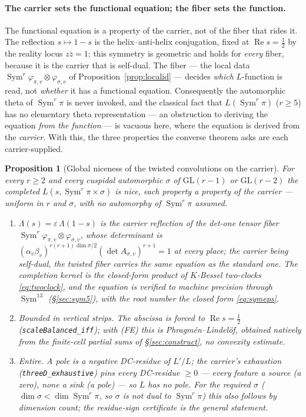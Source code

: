 \documentclass[11pt]{article}
\newtheorem{proposition}[theorem]{Proposition}
\theoremstyle{definition}
\renewcommand{\Re}{\operatorname{Re}}
\newcommand{\Sym}{\operatorname{Sym}}
\begin{document}
\paragraph{The carrier sets the functional equation; the fiber sets the function.} The functional
equation is a property of the carrier, not of the fiber that rides it. The reflection $s\mapsto1-s$ is
the helix--anti-helix conjugation, fixed at $\Re s=\tfrac12$ by the reality locus $z\bar z=1$; this
symmetry is geometric and holds for \emph{every} fiber, because it is the carrier that is self-dual. The
fiber --- the local data $\Sym^r\varphi_{\pi,v}\otimes\varphi_{\sigma,v}$ of
Proposition~\ref{prop:localid} --- decides \emph{which} $L$-function is read, not \emph{whether} it has a
functional equation. Consequently the automorphic theta of $\Sym^r\pi$ is never invoked, and the
classical fact that $L(\Sym^r\pi)$ ($r\ge5$) has no elementary theta representation --- an obstruction to
deriving the equation \emph{from the function} --- is vacuous here, where the equation is derived from
the \emph{carrier}. With this, the three properties the converse theorem asks are each carrier-supplied.

\begin{proposition}[Global niceness of the twisted convolutions on the carrier]\label{prop:niceness}
For every $r\ge2$ and every cuspidal automorphic $\sigma$ of $\mathrm{GL}(r-1)$ or $\mathrm{GL}(r-2)$
the completed $L(s,\Sym^r\pi\times\sigma)$ is nice, each property a property of the carrier --- uniform
in $r$ and $\sigma$, with no automorphy of $\Sym^r\pi$ assumed.
\begin{enumerate}
\item[\textup{(FE)}] $\Lambda(s)=\varepsilon\,\Lambda(1-s)$ is the carrier reflection of the det-one
tensor fiber $\Sym^r\varphi_{\pi,v}\otimes\varphi_{\sigma,v}$, whose determinant is
$(\alpha_v\beta_v)^{r(r+1)\dim\sigma/2}(\det A_{\sigma,v})^{r+1}=1$ at every place; the carrier being
self-dual, the twisted fiber carries the same equation as the standard one. The completion kernel is the
closed-form product of $K$-Bessel two-clocks \eqref{eq:twoclock}, and the equation is verified to machine
precision through $\Sym^{13}$ (\S\ref{sec:sym5}), with the root number the closed form \eqref{eq:symeps}.
\item[\textup{(B)}] \emph{Bounded in vertical strips.} The abscissa is forced to $\Re s=\tfrac12$
(\texttt{scaleBalanced\_iff}); with \textup{(FE)} this is Phragm\'en--Lindel\"of, obtained natively from
the finite-cell partial sums of \S\ref{sec:construct}, no convexity estimate.
\item[\textup{(E)}] \emph{Entire.} A pole is a negative DC-residue of $L'/L$; the carrier's exhaustion
(\texttt{threeD\_exhaustive}) pins every DC-residue $\ge0$ --- every feature a source (a zero), none a
sink (a pole) --- so $L$ has no pole. For the required $\sigma$ ($\dim\sigma<\dim\Sym^r\pi$, so $\sigma$
is not dual to $\Sym^r\pi$) this also follows by dimension count; the residue-sign certificate is the
general statement.
\end{enumerate}
\end{proposition}
\end{document}

